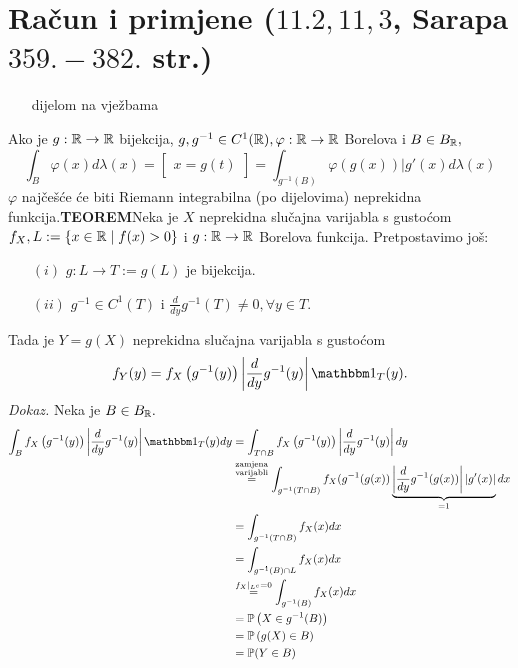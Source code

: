 \documentclass{article}
\begin{document}
\section{Račun i primjene (\textsection \(11.2,11,3\), Sarapa \(359.-382.\) str.)}
\begin{itemize}
    \item[\ding{113}] dijelom na vježbama
\end{itemize}
Ako je \(g:\Bbb R\to\Bbb R\) bijekcija, \(g,g^{-1}\in C^1(\Bbb R),\varphi:\Bbb R\to\Bbb R\) Borelova i \(B\in B_{\Bbb R},\) \[\int_B\varphi(x)d\lambda(x)=\begin{bmatrix}x=g(t)\end{bmatrix}=\int_{g^{-1}(B)}\varphi(g(x))|g'(x)d\lambda(x)\] \(\varphi\) najčešće će biti Riemann integrabilna (po dijelovima) neprekidna funkcija.\newline\newline\textbf{TEOREM}\newline Neka je \(X\) neprekidna slučajna varijabla s gustoćom \(f_X, L:=\left\{x\in\Bbb R\mid f(x)>0\right\}\) i \(g:\Bbb R\to\Bbb R\) Borelova funkcija. Pretpostavimo još:
\begin{enumerate}
    \item[\((i)\)] \(g:L\to T:=g(L)\) je bijekcija.
    \item[\((ii)\)] \(g^{-1}\in C^1(T)\) i \(\frac{d}{dy}g^{-1}(T)\ne 0,\forall y\in T.\)
\end{enumerate}
Tada je \(Y=g(X)\) neprekidna slučajna varijabla s gustoćom \[f_Y(y)=f_X\left(g^{-1}(y)\right)\left|\frac{d}{dy}g^{-1}(y)\right|\mathbbm 1_T(y).\]  
\textit{Dokaz.}\newline
Neka je \(B\in B_{\Bbb R}.\) \[\begin{aligned}\int_Bf_X\left(g^{-1}(y)\right)\left|\frac{d}{dy}g^{-1}(y)\right|\mathbbm 1_T(y)dy&=\int_{T\cap B}f_X\left(g^{-1}(y)\right)\left|\frac{d}{dy}g^{-1}(y)\right|dy\\&\overset{\substack{\text{zamjena}\\\text{varijabli}}}{=}\int_{g^{-1}(T\cap B)}f_X(g^{-1}(g(x))\underbrace{\left|\frac{d}{dy}g^{-1}(g(x))\right|\left|g'(x)\right|}_{=1}dx\\&=\int_{g^{-1}(T\cap B)}f_X(x)dx\\&=\int_{g^{-1}(B)\cap L}f_X(x)dx\\&\overset{f_X\mid_{L^c}=0}{=}\int_{g^{-1}(B)}f_X(x)dx\\&=\Bbb P\left(X\in g^{-1}(B)\right)\\&=\Bbb P\left(g(X)\in B\right)\\&=\Bbb P(Y\in B)\end{aligned}\] 
\end{document}
